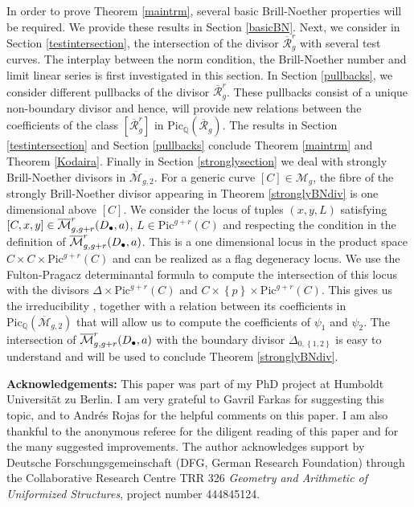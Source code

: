 \documentclass{article}
\theoremstyle{plain}
\theoremstyle{definition}
\def\cM{\mathcal{M}}
\def\rr{\overline{\mathcal{R}}}
\def\mm{\overline{\mathcal{M}}}
\begin{document}
In order to prove Theorem \ref{maintrm}, several basic Brill-Noether properties will be required. We provide these results in Section \ref{basicBN}. Next, we consider in Section \ref{testintersection}, the intersection of the divisor $\rr^r_g$ with several test curves. The interplay between the norm condition, the Brill-Noether number and limit linear series is first investigated in this section. In Section \ref{pullbacks}, we consider different pullbacks of the divisor $\rr^r_g$. These pullbacks consist of a unique non-boundary divisor and hence, will provide new relations between the coefficients of the class $[\rr^r_g]$ in $\mathrm{Pic}_\mathbb{Q}(\rr_g)$. The results in Section \ref{testintersection} and Section \ref{pullbacks} conclude Theorem \ref{maintrm} and Theorem \ref{Kodaira}. Finally in Section \ref{stronglysection} we deal with strongly Brill-Noether divisors in $\mm_{g,2}$. For a generic curve $[C]\in \cM_g$, the fibre of the strongly Brill-Noether divisor appearing in Theorem \ref{stronglyBNdiv} is one dimensional above $[C]$. We consider the locus of tuples $(x,y, L)$ satisfying $[C,x,y] \in \mm^r_{g, g+r}\text{\large (}D_{\bullet}, \textbf{a}\text{\large )}$, $L\in  \mathrm{Pic}^{g+r}(C)$ and respecting the condition in the definition of $\mm^r_{g, g+r}\text{\large (}D_{\bullet}, \textbf{a}\text{\large )}$. This is a one dimensional locus in the product space $C\times C \times \mathrm{Pic}^{g+r}(C)$ and can be realized as a flag degeneracy locus. We use the Fulton-Pragacz determinantal formula to compute the intersection of this locus with the divisors $\Delta \times \mathrm{Pic}^{g+r}(C)$ and $C\times \left\{p\right\} \times \mathrm{Pic}^{g+r}(C)$. This gives us the irreducibility , together with a relation between its coefficients in $\mathrm{Pic}_\mathbb{Q}(\mm_{g,2})$ that will allow us to compute the coefficients of $\psi_1$ and $\psi_2$. The intersection of $\mm^r_{g, g+r}\text{\large (}D_{\bullet}, \textbf{a}\text{\large )}$ with the boundary divisor $\Delta_{0,\left\{1,2\right\}}$ is easy to understand and will be used to conclude Theorem \ref{stronglyBNdiv}.

\textbf{Acknowledgements:} This paper was part of my PhD project at Humboldt Universit\"at zu Berlin. I am very grateful to Gavril Farkas for suggesting this topic, and to Andr\'es Rojas for the helpful comments on this paper. I am also thankful to the anonymous referee for the diligent reading of this paper and for the many suggested improvements. The author acknowledges support by Deutsche Forschungsgemeinschaft
(DFG, German Research Foundation) through the Collaborative Research
Centre TRR 326 \textit{Geometry and Arithmetic of Uniformized Structures}, project number 444845124.
\end{document}
